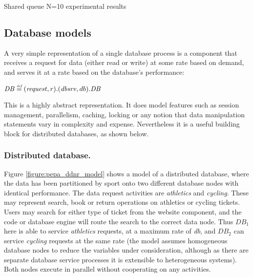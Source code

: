 \begin{table}[h!]
	\begin{center}
		\caption{Shared queue N=10 experimental results}
		\label{table:queue_results}
	\end{center}
\end{table}

%
%
\FloatBarrier
\subsection{Database models}
A very simple representation of a single database process is a component that receives a request for data (either read or write) at some rate based on demand, and serves it at a rate based on the database's performance:
\begin{center}
$\mathit{DB} \stackrel{\mbox{\em {\tiny def}}}{=} (\mathit{request}, r).(\mathit{dbsrv}, db).\mathit{DB}$
\end{center}
This is a highly abstract representation.  It does model features such as session management, parallelism, caching, locking or any notion that data manipulation statements vary in complexity and expense.  Nevertheless it is a useful building block for distributed databases, as shown below.

%
%
\FloatBarrier
\subsubsection{Distributed database.} Figure \ref{figure:pepa_ddnr_model} shows a model of a distributed database, where the data has been partitioned by sport onto two different database nodes with identical performance.  The data request activities are {\itshape athletics} and {\itshape cycling}.  These may represent search, book or return operations on athletics or cycling tickets.  Users may search for either type of ticket from the website component, and the code or database engine will route the search to the correct data node.  Thus $\mathit{DB_1}$ here is able to service {\itshape athletics} requests, at a maximum rate of {\itshape db}, and $\mathit{DB_2}$ can service {\itshape cycling} requests at the same rate (the model assumes homogeneous database nodes to reduce the variables under consideration, although as there are separate database service processes it is extensible to heterogeneous systems).  Both nodes execute in parallel without cooperating on any activities.

